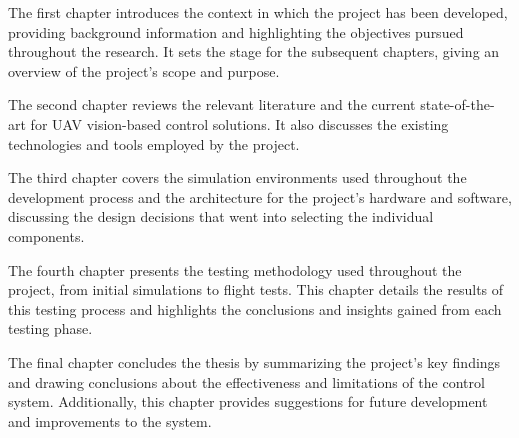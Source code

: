 The first chapter introduces the context in which the project has been developed, providing background information and highlighting the objectives pursued throughout the research. It sets the stage for the subsequent chapters, giving an overview of the project's scope and purpose.

The second chapter reviews the relevant literature and the current state-of-the-art for UAV vision-based control solutions. It also discusses the existing technologies and tools employed by the project.

The third chapter covers the simulation environments used throughout the development process and the architecture for the project's hardware and software, discussing the design decisions that went into selecting the individual components.

The fourth chapter presents the testing methodology used throughout the project, from initial simulations to flight tests. This chapter details the results of this testing process and highlights the conclusions and insights gained from each testing phase.

The final chapter concludes the thesis by summarizing the project's key findings and drawing conclusions about the effectiveness and limitations of the control system. Additionally, this chapter provides suggestions for future development and improvements to the system.
